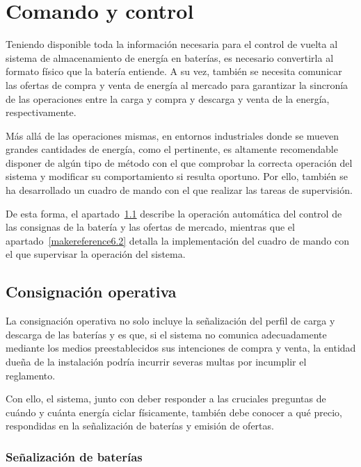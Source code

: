 \cleardoublepage

\chapter{Comando y control}
\label{makereference6}

Teniendo disponible toda la información necesaria para el control de vuelta al sistema de almacenamiento de energía en baterías, es necesario convertirla al formato físico que la batería entiende. A su vez, también se necesita comunicar las ofertas de compra y venta de energía al mercado para garantizar la sincronía de las operaciones entre la carga y compra y descarga y venta de la energía, respectivamente.

Más allá de las operaciones mismas, en entornos industriales donde se mueven grandes cantidades de energía, como el pertinente, es altamente recomendable disponer de algún tipo de método con el que comprobar la correcta operación del sistema y modificar su comportamiento si resulta oportuno. Por ello, también se ha desarrollado un cuadro de mando con el que realizar las tareas de supervisión.

De esta forma, el apartado~\ref{makereference6.1} describe la operación automática del control de las consignas de la batería y las ofertas de mercado, mientras que el apartado~\ref{makereference6.2} detalla la implementación del cuadro de mando con el que supervisar la operación del sistema.

\section{Consignación operativa}
\label{makereference6.1}

La consignación operativa no solo incluye la señalización del perfil de carga y descarga de las baterías y es que, si el sistema no comunica adecuadamente mediante los medios preestablecidos sus intenciones de compra y venta, la entidad dueña de la instalación podría incurrir severas multas por incumplir el reglamento.

Con ello, el sistema, junto con deber responder a las cruciales preguntas de cuándo y cuánta energía ciclar físicamente, también debe conocer a qué precio, respondidas en la señalización de baterías y emisión de ofertas.

\subsection{Señalización de baterías}
\label{makereference6.1.1}

